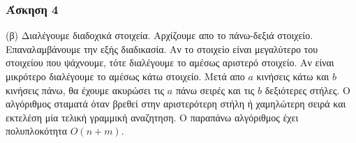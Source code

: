 \newpage

\subsubsection*{Άσκηση 4}

(β) Διαλέγουμε διαδοχικά στοιχεία. Αρχίζουμε απο το πάνω-δεξιά στοιχείο. 
Επαναλαμβάνουμε την εξής διαδικασία. Αν το στοιχείο είναι μεγαλύτερο του στοιχείου που ψάχνουμε, τότε διαλέγουμε το αμέσως αριστερό στοιχείο. Αν είναι μικρότερο διαλέγουμε το αμέσως κάτω στοιχείο.
Μετά απο $a$ κινήσεις κάτω και $b$ κινήσεις πάνω, θα έχουμε ακυρώσει τις $a$ πάνω σειρές και τις $b$ δεξιότερες στήλες. Ο αλγόριθμος σταματά όταν βρεθεί στην αριστερότερη στήλη ή χαμηλώτερη σειρά
και εκτελέση μία τελική γραμμική αναζητηση. Ο παραπάνω αλγόριθμος έχει πολυπλοκότητα $O(n+m)$. 
